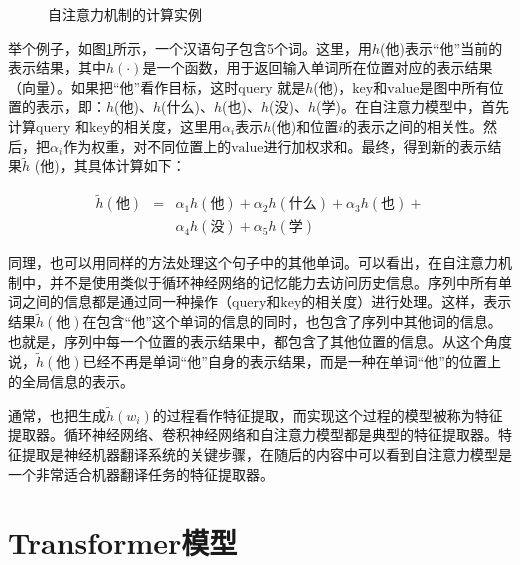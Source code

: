\begin{figure}[htp]
\centering

\caption{自注意力机制的计算实例}
\label{fig:12-3}
\end{figure}

\parinterval 举个例子，如图\ref{fig:12-3}所示，一个汉语句子包含5个词。这里，用$h$(他)表示“他”当前的表示结果，其中$h(\cdot)$是一个函数，用于返回输入单词所在位置对应的表示结果（向量）。如果把“他”看作目标，这时$\mathrm{query}$ 就是$h$(他)，$\mathrm{key}$和$\mathrm{value}$是图中所有位置的表示，即：{$h$(他)、$h$(什么)、$h$(也)、$h$(没)、$h$(学)}。在自注意力模型中，首先计算$\mathrm{query}$ 和$\mathrm{key}$的相关度，这里用$\alpha_i$表示$h$(他)和位置$i$的表示之间的相关性。然后，把$\alpha_i$作为权重，对不同位置上的$\mathrm{value}$进行加权求和。最终，得到新的表示结果$\tilde{h}$ (他)，其具体计算如下：

\begin{eqnarray}
\tilde{h} (\textrm{他} ) & = & \alpha_1 {h} (\textrm{他} ) + \alpha_2 {h} (\textrm{什么}) + \alpha_3 {h} (\textrm{也} ) + \nonumber \\
                         &   & \alpha_4 {h} (\textrm{没} ) +\alpha_5 {h} (\textrm{学} )
\label{eq:12-2}
\end{eqnarray}

\parinterval 同理，也可以用同样的方法处理这个句子中的其他单词。可以看出，在自注意力机制中，并不是使用类似于循环神经网络的记忆能力去访问历史信息。序列中所有单词之间的信息都是通过同一种操作（$\mathrm{query}$和$\mathrm{key}$的相关度）进行处理。这样，表示结果$\tilde{h} (\textrm{他})$在包含“他”这个单词的信息的同时，也包含了序列中其他词的信息。也就是，序列中每一个位置的表示结果中，都包含了其他位置的信息。从这个角度说，$\tilde{h} (\textrm{他})$已经不再是单词“他”自身的表示结果，而是一种在单词“他”的位置上的全局信息的表示。

\parinterval 通常，也把生成$\tilde{h}(w_i)$的过程看作特征提取，而实现这个过程的模型被称为特征提取器。循环神经网络、卷积神经网络和自注意力模型都是典型的特征提取器。特征提取是神经机器翻译系统的关键步骤，在随后的内容中可以看到自注意力模型是一个非常适合机器翻译任务的特征提取器。

\sectionnewpage
\section{Transformer模型}

